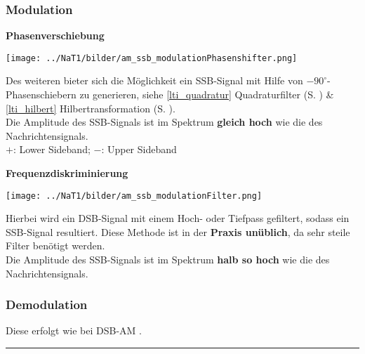\subsubsection{Modulation}
\textbf{Phasenverschiebung }  \\
\begin{minipage}[t][3.7cm][c]{7.5cm}
    \texttt{[image: ../NaT1/bilder/am\_ssb\_modulationPhasenshifter.png]}
\end{minipage}
\begin{minipage}[t][3.7cm][c]{10.5cm}	
	Des weiteren bieter sich die Möglichkeit ein SSB-Signal mit Hilfe von 
	$ - 90^{\circ} $-Phasenschiebern zu generieren, {\small siehe
	\ref{lti_quadratur} Quadraturfilter (S. \pageref{lti_quadratur}) \&
	\ref{lti_hilbert} Hilbertransformation (S. \pageref{lti_hilbert})}.\\
	Die Amplitude des SSB-Signals ist im Spektrum \textbf{gleich hoch} wie die des
	Nachrichtensignals.\\ 
	$+$: Lower Sideband; \qquad $-$: Upper Sideband
\end{minipage}

\textbf{Frequenzdiskriminierung} \\
\begin{minipage}[t][2cm][c]{5.5cm}
    \texttt{[image: ../NaT1/bilder/am\_ssb\_modulationFilter.png]}
\end{minipage}
\begin{minipage}[t][2cm][c]{12.5cm}	
	Hierbei wird ein DSB-Signal mit einem Hoch- oder Tiefpass gefiltert, sodass ein SSB-Signal
	resultiert. Diese Methode ist in der \textbf{Praxis unüblich}, da sehr steile Filter benötigt
	werden.\\
	Die Amplitude des SSB-Signals ist im Spektrum \textbf{halb so hoch} wie die des
	Nachrichtensignals.
\end{minipage}

\subsubsection{Demodulation}
Diese erfolgt wie bei DSB-AM .\\

\hrule
{}
